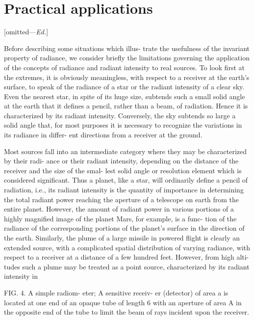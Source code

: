 \section{Practical applications}
[omitted---\textit{Ed.}]

\ifomit
Before describing some situations which illus-
trate the usefulness of the invariant property of
radiance, we consider briefly the limitations
governing the application of the concepts of
radiance and radiant intensity to real sources.
To look first at the extremes, it is obviously
meaningless, with respect to a receiver at the
earth’s surface, to speak of the radiance of a star
or the radiant intensity of a clear sky. Even the
nearest star, in spite of its huge size, subtends
such a small solid angle at the earth that it
defines a pencil, rather than a beam, of radiation.
Hence it is characterized by its radiant intensity.
Conversely, the sky subtends so large a solid
angle that, for most purposes it is necessary to
recognize the variations in its radiance in differ-
ent directions from a receiver at the ground.

Most sources fall into an intermediate category
where they may be characterized by their radi-
ance or their radiant intensity, depending on the
distance of the receiver and the size of the smal-
lest solid angle or resolution element which is
considered significant. Thus a planet, like a star,
will ordinarily define a pencil of radiation, i.e.,
its radiant intensity is the quantity of importance
in determining the total radiant power reaching
the aperture of a telescope on earth from the
entire planet. However, the amount of radiant
power in various portions of a highly magnified
image of the planet Mars, for example, is a func-
tion of the radiance of the corresponding portions
of the planet's surface in the direction of the
earth. Similarly, the plume of a large missile in
powered flight is clearly an extended source, with
a complicated spatial distribution of varying
radiance, with respect to a receiver at a distance
of a few hundred feet. However, from high alti-
tudes such a plume may be treated as a point
source, characterized by its radiant intensity in

FIG. 4. A simple radiom-
eter; A sensitive receiv-
er (detector) of area a
is located at one end of
an opaque tube of length
6 with an aperture of area
A in the opposite end of
the tube to limit the beam
of rays incident upon the
receiver.



